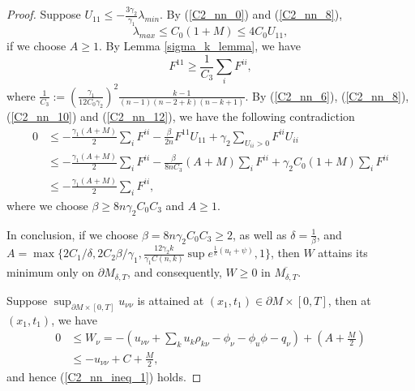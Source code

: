 \documentclass[12pt]{amsart}
\theoremstyle{definition}
\theoremstyle{remark}
\numberwithin{equation}{section}
\begin{document}
\begin{proof}
	
	Suppose $U_{11} \leq - \frac{3\gamma_2}{\gamma_1} \lambda_{min}$. By (\ref{C2_nn_0}) and (\ref{C2_nn_8}),
	\begin{equation}\label{C2_nn_10}
	\lambda_{max} \leq C_0 (1 + M) \leq 4 C_0 U_{11},
	\end{equation}
	if we choose $A \geq 1$. By Lemma \ref{sigma_k_lemma}, we have 
	\begin{equation}\label{C2_nn_12}
	F^{11} \geq \frac{1}{C_3} \sum_i F^{ii},
	\end{equation} 
	where $\frac{1}{C_3} := \left( \frac{\gamma_1}{12 C_0 \gamma_2} \right)^2 \frac{k - 1}{(n-1)(n-2+k) (n-k+1)}$.
	By (\ref{C2_nn_6}), (\ref{C2_nn_8}), (\ref{C2_nn_10}) and (\ref{C2_nn_12}), we have the following contradiction
	\begin{equation}\label{C2_nn_11}
	\begin{aligned}
	0 &\leq - \frac{\gamma_1 (A + M)}{2} \sum_i F^{ii} - \frac{\beta}{2n} F^{11} U_{11} + \gamma_2 \sum_{U_{ii} > 0} F^{ii} U_{ii}\\
	&\leq - \frac{\gamma_1 (A + M)}{2} \sum_i F^{ii} - \frac{\beta}{8n C_3} (A + M) \sum_i F^{ii} + \gamma_2 C_0 (1 + M) \sum_{i} F^{ii}\\ &\leq - \frac{\gamma_1 (A + M)}{2} \sum_i F^{ii},
	\end{aligned}
	\end{equation}
	where we choose $\beta \geq 8n\gamma_2 C_0 C_3$ and $A \geq 1$.
	
	
	In conclusion, if we choose $\beta = 8 n \gamma_2 C_0 C_3 \geq 2$, as well as $\delta = \frac{1}{\beta}$, and $A = \max\{2C_1/\delta, 2C_2 \beta / \gamma_1, \frac{12\gamma_2 k}{\gamma_1 C(n,k)} \sup e^{\frac{1}{k}(u_t + \psi)}, 1\}$, then $W$ attains its minimum only on $\partial M_{\delta, T}$, and consequently, $W \geq 0$ in $\overline{M_{\delta, T}}$.
	
	Suppose $\sup_{\partial M \times [0, T]} u_{\nu\nu}$ is attained at $(x_1, t_1) \in \partial M \times [0, T]$, then at $(x_1, t_1)$, we have
	\begin{equation}%
	\begin{aligned}
	0 &\leq W_\nu 
	= - \left(u_{\nu\nu} + \sum_k u_{k} \rho_{k\nu} - \phi_\nu - \phi_{u} \phi - q_{\nu} \right) + (A + \frac{M}{2}) \\
	&\leq - u_{\nu\nu} + C + \frac{M}{2},
	\end{aligned}
	\end{equation}
	and hence (\ref{C2_nn_ineq_1}) holds. 
\end{proof}
\end{document}

